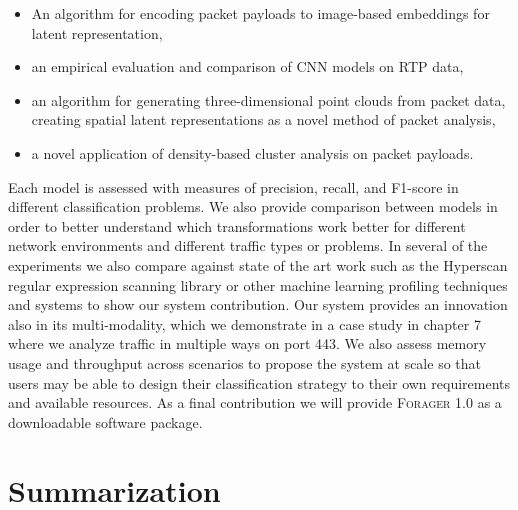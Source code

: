 \begin{itemize}
\item An algorithm for encoding packet payloads to image-based embeddings for latent representation,
\item an empirical evaluation and comparison of CNN models on RTP data,
\item an algorithm for generating three-dimensional point clouds from packet data, creating spatial latent representations as a novel method of packet analysis,
\item a novel application of density-based cluster analysis on packet payloads.
\end{itemize}

Each model is assessed with measures of precision, recall, and F1-score in different classification problems. We also provide comparison between models in order to better understand which transformations work better for different network environments and different traffic types or problems. In several of the experiments we also compare against state of the art work such as the Hyperscan regular expression scanning library or other machine learning profiling techniques and systems to show our system contribution. Our system provides an innovation also in its multi-modality, which we demonstrate in a case study in chapter 7 where we analyze traffic in multiple ways on port 443. We also assess memory usage and throughput across scenarios to propose the system at scale so that users may be able to design their classification strategy to their own requirements and available resources. As a final contribution we will provide \textsc{Forager} 1.0 as a downloadable software package.

\section{Summarization}

